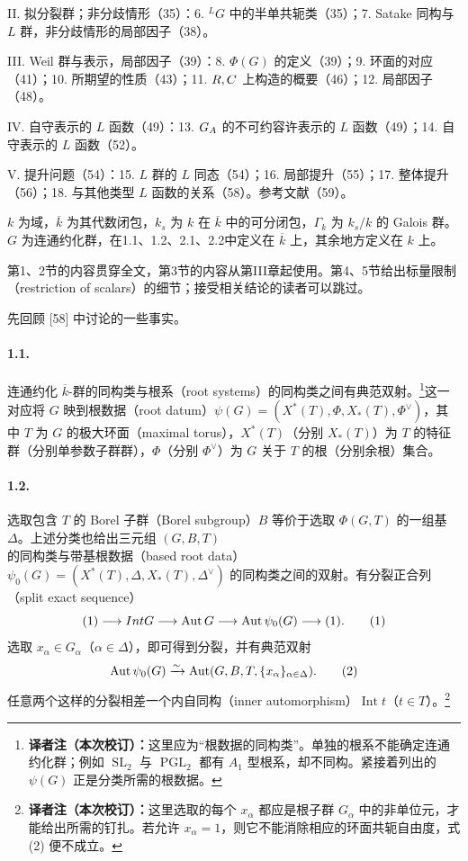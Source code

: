 II. 拟分裂群；非分歧情形（35）：6. ${}^LG$ 中的半单共轭类（35）；7. Satake 同构与 $L$ 群，非分歧情形的局部因子（38）。

III. Weil 群与表示，局部因子（39）：8. $\Phi(G)$ 的定义（39）；9. 环面的对应（41）；10. 所期望的性质（43）；11. $R,C$ 上构造的概要（46）；12. 局部因子（48）。

IV. 自守表示的 $L$ 函数（49）：13. $G_{A}$ 的不可约容许表示的 $L$ 函数（49）；14. 自守表示的 $L$ 函数（52）。

V. 提升问题（54）：15. $L$ 群的 $L$ 同态（54）；16. 局部提升（55）；17. 整体提升（56）；18. 与其他类型 $L$ 函数的关系（58）。参考文献（59）。

$k$ 为域，$\overline k$ 为其代数闭包，$k_s$ 为 $k$ 在 $\overline k$ 中的可分闭包，$\Gamma_k$ 为 $k_s/k$ 的 Galois 群。$G$ 为连通约化群，在1.1、1.2、2.1、2.2中定义在 $\overline k$ 上，其余地方定义在 $k$ 上。

第1、2节的内容贯穿全文，第3节的内容从第III章起使用。第4、5节给出标量限制（restriction of scalars）的细节；接受相关结论的读者可以跳过。

先回顾 [58] 中讨论的一些事实。

\paragraph*{1.1.} 连通约化 $\overline k$-群的同构类与根系（root systems）的同构类之间有典范双射。\footnote{\textbf{译者注（本次校订）：}这里应为“根数据的同构类”。单独的根系不能确定连通约化群；例如 $\operatorname{SL}_2$ 与 $\operatorname{PGL}_2$ 都有 $A_1$ 型根系，却不同构。紧接着列出的 $\psi(G)$ 正是分类所需的根数据。}这一对应将 $G$ 映到根数据（root datum）$\psi(G)=(X^*(T),\Phi,X_*(T),\Phi^\vee)$，其中 $T$ 为 $G$ 的极大环面（maximal torus），$X^*(T)$（分别 $X_*(T)$）为 $T$ 的特征群（分别单参数子群群），$\Phi$（分别 $\Phi^\vee$）为 $G$ 关于 $T$ 的根（分别余根）集合。

\paragraph*{1.2.} 选取包含 $T$ 的 Borel 子群（Borel subgroup）$B$ 等价于选取 $\Phi(G,T)$ 的一组基 $\Delta$。上述分类也给出三元组 $(G,B,T)$ 的同构类与带基根数据（based root data）$\psi_0(G)=(X^*(T),\Delta,X_*(T),\Delta^\vee)$ 的同构类之间的双射。有分裂正合列（split exact sequence）
\begin{equation}
 (1)\longrightarrow\operatorname{Int}G\longrightarrow\Aut G\longrightarrow\Aut\psi_0(G)\longrightarrow(1).\tag{1}
\end{equation}
选取 $x_\alpha\in G_\alpha$（$\alpha\in\Delta$），即可得到分裂，并有典范双射
\begin{equation}
 \Aut\psi_0(G)\xrightarrow{\sim}\Aut(G,B,T,\{x_\alpha\}_{\alpha\in\Delta}).\tag{2}
\end{equation}
任意两个这样的分裂相差一个内自同构（inner automorphism）$\operatorname{Int}t$（$t\in T$）。\footnote{\textbf{译者注（本次校订）：}这里选取的每个 $x_\alpha$ 都应是根子群 $G_\alpha$ 中的非单位元，才能给出所需的钉扎。若允许 $x_\alpha=1$，则它不能消除相应的环面共轭自由度，式 (2) 便不成立。}


